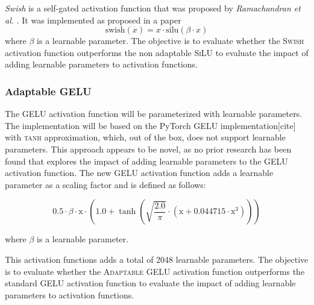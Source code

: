 \textit{Swish} is a self-gated activation function that was proposed by \textit{Ramachandran et al.} \cite{Ramachandran2017}. It was implemented as proposed in a paper
\[
    \text{swish}(x) = x \cdot \text{silu}(\beta \cdot x)
\]
where \(\beta\) is a learnable parameter. The objective is to evaluate whether the \textsc{Swish} activation function outperforms the non adaptable \textsc{SiLU} to evaluate the impact of adding learnable parameters to activation functions.

\subsubsection{Adaptable GELU}
The GELU activation function will be parameterized with learnable parameters. The implementation will be based on the PyTorch GELU implementation[cite] with \textsc{tanh} approximation, which, out of the box, does not support learnable parameters. This approach appears to be novel, as no prior research has been found that explores the impact of adding learnable parameters to the \textsc{GELU} activation function. The new \textsc{GELU} activation function adds a learnable parameter as a scaling factor and is defined as follows:

\[
    0.5 \cdot \beta \cdot \text{x} \cdot \left( 1.0 + \tanh \left( \sqrt{\frac{2.0}{\pi}} \cdot (\text{x} + 0.044715 \cdot \text{x}^3) \right) \right)
\]

where \(\beta\) is a learnable parameter. 

This activation functions adds a total of 2048 learnable parameters. The objective is to evaluate whether the \textsc{Adaptable GELU} activation function outperforms the standard \textsc{GELU} activation function to evaluate the impact of adding learnable parameters to activation functions.



